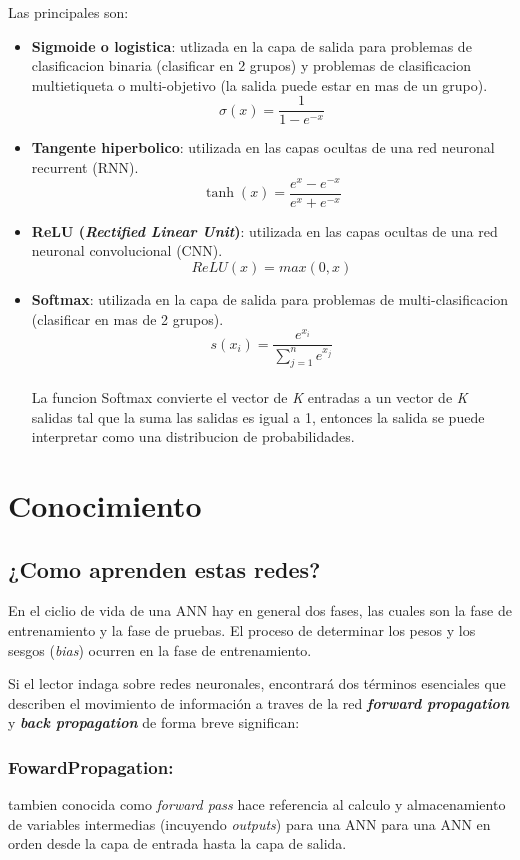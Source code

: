 \documentclass[runningheads]{llncs} %
\begin{document}
Las principales son: 
\begin{itemize}
    \item{\textbf{Sigmoide o logistica}: utlizada en la capa de salida
    para problemas de clasificacion binaria (clasificar en 2 grupos) y problemas
    de clasificacion multietiqueta o multi-objetivo (la salida puede estar 
    en mas de un grupo). \cite{fun-activacion}
    \[\sigma(x) = \frac{1}{1-e^{-x}}\] } 
    \item{\textbf{Tangente hiperbolico}: utilizada en las capas ocultas 
    de una red neuronal recurrent (RNN). \cite{fun-activacion}
    \[\tanh(x) = \frac{e^{x}-e^{-x}}{e^{x}+e^{-x}}\]}
    \item{\textbf{ReLU (\textit{Rectified Linear Unit})}: utilizada en las capas
    ocultas de una red neuronal convolucional (CNN). \cite{fun-activacion}
    \[ReLU(x) = max(0,x)\]} 
    \item{\textbf{Softmax}: utilizada en la capa de salida para problemas
    de multi-clasificacion (clasificar en mas de 2 grupos). \cite{fun-activacion}
    \[ s(x_{i}) = \frac{e^{x_{i}}}{\sum_{j=1}^{n}{e^{x_{j}}}} \]}\\
    La funcion Softmax convierte el vector de \textit{K} entradas a un vector 
    de \textit{K} salidas tal que la suma las salidas es igual a 1,
    entonces la salida se puede interpretar como una distribucion de probabilidades.
    \cite{fun-softmax}
\end{itemize}

\section{Conocimiento}
\subsection{¿Como aprenden estas redes?}
En el ciclio de vida de una ANN hay en general dos fases, las cuales son 
la fase de entrenamiento y la fase de pruebas. El proceso de determinar
los pesos y los sesgos (\textit{bias}) ocurren en la fase de entrenamiento. 
\cite{backpropagation}

Si el lector indaga sobre redes neuronales, encontrará dos términos esenciales 
que describen el movimiento de información a traves de la red 
\textbf{\textit{forward propagation}} y \textbf{\textit{back propagation}} \cite{fun-activacion}
de forma breve significan: 

\subsubsection{FowardPropagation:}
tambien conocida como \textit{forward pass} hace referencia al calculo y
almacenamiento de variables intermedias (incuyendo \textit{outputs}) para
una ANN para una ANN en orden desde la capa de entrada hasta la capa de salida. 
\cite{zhang2023dive}
\end{document}
